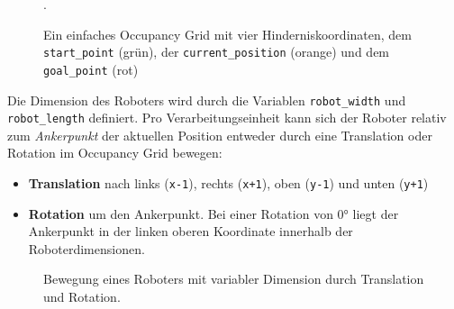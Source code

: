 \begin{figure}[H]
\begin{minipage}{0.35\textwidth}
	\end{minipage}
	\hspace*{\fill}
	\caption{Ein einfaches Occupancy Grid mit vier Hinderniskoordinaten, dem \texttt{start\_point} (grün), der \texttt{current\_position} (orange) und dem \texttt{goal\_point} (rot)}.
\end{figure}

\vspace*{-0.3cm}
Die Dimension des Roboters wird durch die Variablen \texttt{robot\_width} und \texttt{robot\_length} definiert. Pro Verarbeitungseinheit kann sich der Roboter relativ zum \textit{Ankerpunkt} der aktuellen Position entweder durch eine Translation oder Rotation im Occupancy Grid bewegen:
\begin{itemize}
\item \textbf{Translation} nach links (\texttt{x-1}), rechts (\texttt{x+1}), oben (\texttt{y-1}) und unten (\texttt{y+1})
\item \textbf{Rotation} um den Ankerpunkt. Bei einer Rotation von $0$° liegt der Ankerpunkt in der linken oberen Koordinate innerhalb der Roboterdimensionen.
\end{itemize}
\vspace*{0.3cm}
\begin{figure}[H]
	\centering
	\footnotesize
	\centerline{\resizebox{1\linewidth}{!}{}}
	\caption{Bewegung eines Roboters mit variabler Dimension durch Translation und Rotation.}
\end{figure}

